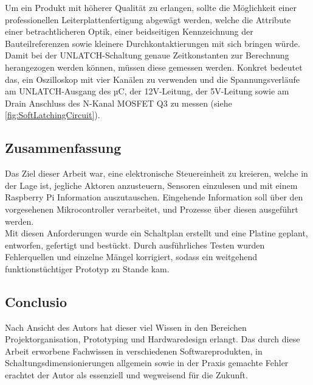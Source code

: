 Um ein Produkt mit höherer Qualität zu erlangen, sollte die Möglichkeit einer professionellen Leiterplattenfertigung abgewägt werden,
welche die Attribute einer betrachtlicheren Optik, einer beidseitigen Kennzeichnung der Bauteilreferenzen sowie kleinere Durchkontaktierungen mit sich bringen würde. \\

Damit bei der UNLATCH-Schaltung genaue Zeitkonstanten zur Berechnung herangezogen werden können, müssen diese gemessen werden.
Konkret bedeutet das, ein Oszilloskop mit vier Kanälen zu verwenden und
die Spannungsverläufe am UNLATCH-Ausgang des µC, der 12V-Leitung, der 5V-Leitung sowie am Drain Anschluss des N-Kanal MOSFET Q3 zu messen (siehe \autoref{fig:SoftLatchingCircuit}).

\subsection{Zusammenfassung}

Das Ziel dieser Arbeit war, eine elektronische Steuereinheit zu kreieren, welche in der Lage ist, jegliche Aktoren anzusteuern, Sensoren einzulesen und mit einem Raspberry Pi Information auszutauschen.
Eingehende Information soll über den vorgesehenen Mikrocontroller verarbeitet, und Prozesse über diesen ausgeführt werden. \\

Mit diesen Anforderungen wurde ein Schaltplan erstellt und eine Platine geplant, entworfen, gefertigt und bestückt.
Durch ausführliches Testen wurden Fehlerquellen und einzelne Mängel korrigiert, sodass ein weitgehend funktionstüchtiger Prototyp zu Stande kam.\\

\subsection{Conclusio}

Nach Ansicht des Autors hat dieser viel Wissen in den Bereichen Projektorganisation, Prototyping und Hardwaredesign erlangt.
Das durch diese Arbeit erworbene Fachwissen in verschiedenen Softwareprodukten,
in Schaltungsdimensionierungen allgemein sowie in der Praxis gemachte Fehler erachtet der Autor als essenziell und wegweisend für die Zukunft.

